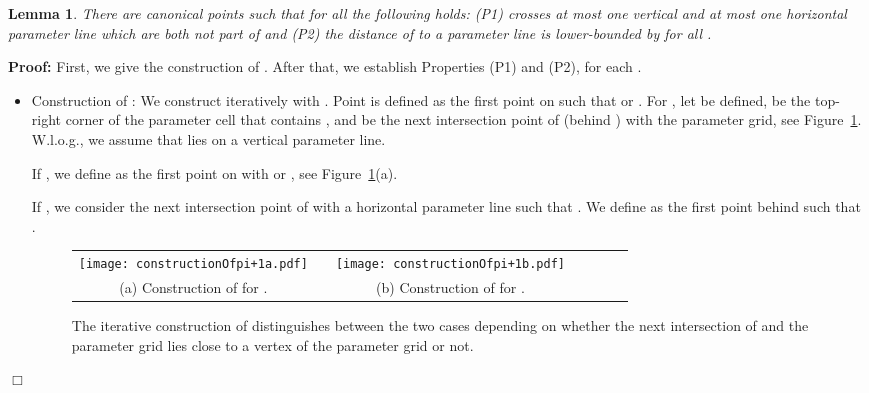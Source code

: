 \documentclass[a4paper,11pt]{article}
\newtheorem{lemma}{Lemma}
\newenvironment{proof}{\textbf{Proof:}}{\hspace*{0mm}\hfill\ensuremath{\Box}}
\begin{document}
\begin{lemma}\label{lem:separatingPoints}
	There are canonical points  such that for all  the following holds: (P1)  crosses at most one vertical and at most one horizontal parameter line which are both not part of  and (P2) the distance of  to a parameter line is lower-bounded by  for all .
\end{lemma}
\begin{proof} First, we give the construction of . After that, we establish Properties (P1) and  (P2), for each .
\begin{itemize}
	\item Construction of : We construct  iteratively with . Point  is defined as the first point on  such that  or . For , let  be defined,  be the top-right corner of the parameter cell that contains , and  be the next intersection point of  (behind ) with the parameter grid, see Figure~\ref{fig:constructionSequenceCanonicalPoints}. W.l.o.g., we assume that  lies on a vertical parameter line.
	
	If , we define  as the first point on  with  or , see Figure~\ref{fig:constructionSequenceCanonicalPoints}(a).
	
	If , we consider the next intersection point  of  with a horizontal parameter line such that . We define  as the first point behind  such that .
	
\begin{figure}[ht]
  \begin{center}
    \begin{tabular}{ccccccc}
      \texttt{[image: constructionOfpi+1a.pdf]} & &
       \texttt{[image: constructionOfpi+1b.pdf]}&&\\ 
{\small (a) Construction of  for .} & &
      {\small (b) Construction of  for .}&&
    \end{tabular}
  \end{center}
  \vspace*{-12pt}
  \caption{The iterative construction of  distinguishes between the two cases depending on whether the next intersection  of  and the parameter grid lies close to a vertex  of the parameter grid or not.}
  \label{fig:constructionSequenceCanonicalPoints}
\end{figure}


\end{itemize}
\end{proof}
\end{document}
